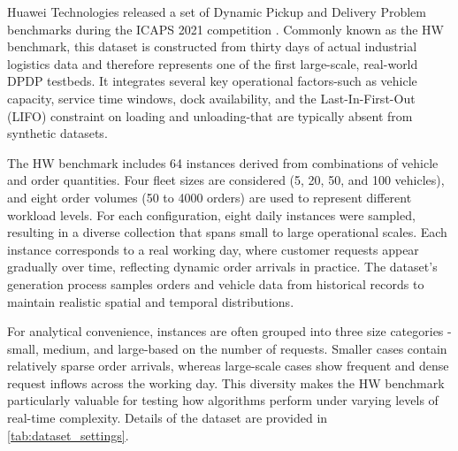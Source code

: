 \documentclass[pdflatex]{sn-jnl}
\begin{document}

 Huawei Technologies released a set of Dynamic Pickup and Delivery Problem benchmarks during the ICAPS 2021 competition \cite{hao2022introduction}. Commonly known as the HW benchmark, this dataset is constructed from thirty days of actual industrial logistics data and therefore represents one of the first large-scale, real-world DPDP testbeds. It integrates several key operational factors-such as vehicle capacity, service time windows, dock availability, and the Last-In-First-Out (LIFO) constraint on loading and unloading-that are typically absent from synthetic datasets.

The HW benchmark includes 64 instances derived from combinations of vehicle and order quantities. Four fleet sizes are considered (5, 20, 50, and 100 vehicles), and eight order volumes (50 to 4000 orders) are used to represent different workload levels. For each configuration, eight daily instances were sampled, resulting in a diverse collection that spans small to large operational scales. Each instance corresponds to a real working day, where customer requests appear gradually over time, reflecting dynamic order arrivals in practice. The dataset’s generation process samples orders and vehicle data from historical records to maintain realistic spatial and temporal distributions.

For analytical convenience, instances are often grouped into three size categories - small, medium, and large-based on the number of requests. Smaller cases contain relatively sparse order arrivals, whereas large-scale cases show frequent and dense request inflows across the working day. This diversity makes the HW benchmark particularly valuable for testing how algorithms perform under varying levels of real-time complexity. Details of the dataset are provided in \autoref{tab:dataset_settings}.
\end{document}
